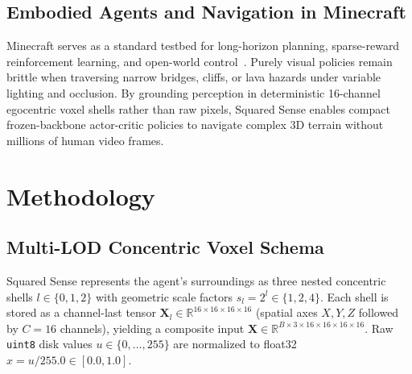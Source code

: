 \documentclass[runningheads]{llncs}
\begin{document}
\subsection{Embodied Agents and Navigation in Minecraft}
Minecraft serves as a standard testbed for long-horizon planning, sparse-reward reinforcement learning, and open-world control~\cite{guss2019minerl,fan2022minedojo,wang2023voyager}. Purely visual policies remain brittle when traversing narrow bridges, cliffs, or lava hazards under variable lighting and occlusion. By grounding perception in deterministic 16-channel egocentric voxel shells rather than raw pixels, Squared Sense enables compact frozen-backbone actor-critic policies to navigate complex 3D terrain without millions of human video frames.

\section{Methodology}

\subsection{Multi-LOD Concentric Voxel Schema}
Squared Sense represents the agent's surroundings as three nested concentric shells $l \in \{0, 1, 2\}$ with geometric scale factors $s_l = 2^l \in \{1, 2, 4\}$. Each shell is stored as a channel-last tensor $\mathbf{X}_l \in \mathbb{R}^{16 \times 16 \times 16 \times 16}$ (spatial axes $X, Y, Z$ followed by $C = 16$ channels), yielding a composite input $\mathbf{X} \in \mathbb{R}^{B \times 3 \times 16 \times 16 \times 16 \times 16}$. Raw \texttt{uint8} disk values $u \in \{0, \dots, 255\}$ are normalized to float32 $x = u / 255.0 \in [0.0, 1.0]$.
\end{document}

